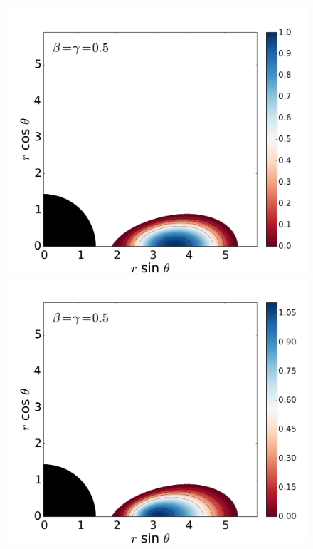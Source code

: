 \documentclass{aa}
\begin{document}
\begin{figure}[t]
\centering
\includegraphics[scale=0.14]{figures/fig3a.pdf}
\hspace{-0.3cm}
\includegraphics[scale=0.14]{figures/fig3b.pdf}
\hspace{-0.2cm}

\end{figure}
\end{document}

